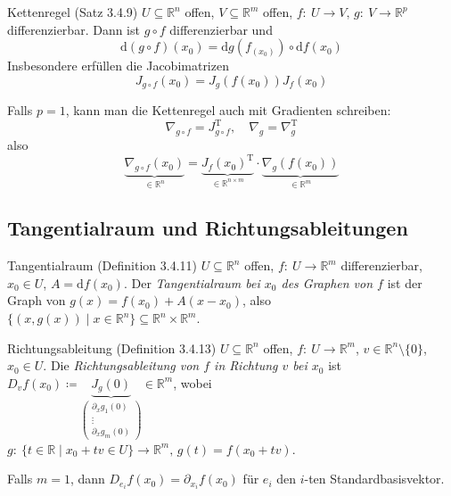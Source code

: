 \documentclass[a4paper,10pt]{article}
\def\R{\mathbb{R}}
\begin{document}
\begin{subbox}{Kettenregel (Satz 3.4.9)}
    \( U \subseteq \R^n \) offen, \( V \subseteq \R^m \) offen, \( f: \: U \to V, \, g: \: V \to \R^p \) differenzierbar. Dann ist \( g \circ f \) differenzierbar und
    \[ \mathrm{d} (g \circ f)(x_0) = \mathrm{d} g(f_(x_0)) \circ \mathrm{d} f(x_0) \]
    Insbesondere erfüllen die Jacobimatrizen
    \[ J_{g \circ f}(x_0) = J_g(f(x_0)) J_f(x_0) \]
\end{subbox}

Falls \( p = 1 \), kann man die Kettenregel auch mit Gradienten schreiben:
\[ \nabla_{g \circ f} = J_{g \circ f}^\mathrm{T}, \quad \nabla_g = \nabla_g^\mathrm{T} \]
also
\[ \underbrace{\nabla_{g \circ f}(x_0)}_{\in \R^n} = \underbrace{J_f(x_0)^\mathrm{T}}_{\in \R^{n \! \times \! m}} \cdot \underbrace{\nabla_g(f(x_0))}_{\in \R^m} \]


\subsection{Tangentialraum und Richtungsableitungen}

\begin{mainbox}{Tangentialraum (Definition 3.4.11)}
    \( U \subseteq \R^n \) offen, \( f: \: U \to \R^m \) differenzierbar, \( x_0 \in U \), \( A = \mathrm{d} f(x_0) \). Der \emph{Tangentialraum bei \( x_0 \) des Graphen von \( f \)} ist der Graph von \( g(x) = f(x_0) + A(x - x_0) \), also \( \{ (x, g(x)) \; | \; x \in \R^n \} \subseteq \R^n \times \R^m \).
\end{mainbox}

\begin{subbox}{Richtungsableitung (Definition 3.4.13)}
    \( U \subseteq \R^n \) offen, \(f: \: U \to \R^m \), \( v \in \R^n \setminus \{ 0 \} \), \(x_0 \in U \). Die \emph{Richtungsableitung von \( f \) in Richtung \( v \) bei \( x_0 \)} ist \( D_v f(x_0) \coloneqq \underbrace{J_g(0)}_{\left( \begin{smallmatrix}
        \partial_x g_1(0) \\
        \vdots \\
        \partial_x g_m(0)
    \end{smallmatrix} \right)} \in \R^m \), wobei \( g: \: \{ t \in \R \; | \; x_0 + tv \in U \} \to \R^m, \, g(t) = f(x_0 + tv) \).
\end{subbox}

Falls \( m = 1\), dann \( D_{e_i} f(x_0) = \partial_{x_i} f(x_0) \) für \( e_i \) den \( i \)-ten Standardbasisvektor.
\end{document}
